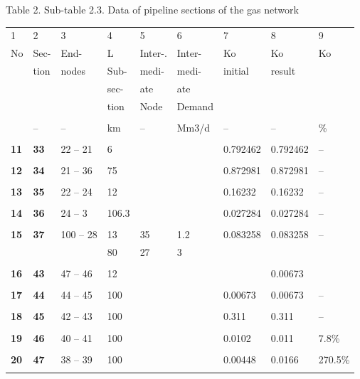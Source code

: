 \documentclass{article}
\begin{document}
\bigskip

\newpage

\bigskip

Table 2. Sub-table 2.3. Data of pipeline sections of the gas network

\bigskip

\begin{tabular}{lllllllll}
1 & 2 & 3 & 4 & 5 & 6 & 7 & 8 & 9 \\ 
No & Sec- & End- & L & Inter-. & Inter- & Ko & Ko & Ko \\ 
& tion & nodes & Sub- & medi- & medi- & initial & result &  \\ 
&  &  & sec- & ate & ate &  &  &  \\ 
&  &  & tion & Node & Demand &  &  &  \\ 
&  &  &  &  &  &  &  &  \\ 
& -- & -- & km & -- & Mm3/d & -- & -- & \% \\ 
&  &  &  &  &  &  &  &  \\ 
\textbf{11} & \textbf{33} & 22 -- 21 & 6 &  &  & 0.792462 & 0.792462 & -- \\ 
&  &  &  &  &  &  &  &  \\ 
\textbf{12} & \textbf{34} & 21 -- 36 & 75 &  &  & 0.872981 & 0.872981 & --
\\ 
&  &  &  &  &  &  &  &  \\ 
\textbf{13} & \textbf{35} & 22 -- 24 & 12 &  &  & 0.16232 & 0.16232 & -- \\ 
&  &  &  &  &  &  &  &  \\ 
\textbf{14} & \textbf{36} & 24 -- 3 & 106.3 &  &  & 0.027284 & 0.027284 & --
\\ 
&  &  &  &  &  &  &  &  \\ 
\textbf{15} & \textbf{37} & 100 -- 28 & 13 & 35 & 1.2 & 0.083258 & 0.083258
& -- \\ 
&  &  & 80 & 27 & 3 &  &  &  \\ 
&  &  &  &  &  &  &  &  \\ 
\textbf{16} & \textbf{43} & 47 -- 46 & 12 &  &  &  & 0.00673 &  \\ 
&  &  &  &  &  &  &  &  \\ 
\textbf{17} & \textbf{44} & 44 -- 45 & 100 &  &  & 0.00673 & 0.00673 & -- \\ 
&  &  &  &  &  &  &  &  \\ 
\textbf{18} & \textbf{45} & 42 -- 43 & 100 &  &  & 0.311 & 0.311 & -- \\ 
&  &  &  &  &  &  &  &  \\ 
\textbf{19} & \textbf{46} & 40 -- 41 & 100 &  &  & 0.0102 & 0.011 & 7.8\% \\ 
&  &  &  &  &  &  &  &  \\ 
\textbf{20} & \textbf{47} & 38 -- 39 & 100 &  &  & 0.00448 & 0.0166 & 270.5\%
\\ 
&  &  &  &  &  &  &  & 
\end{tabular}
\end{document}
